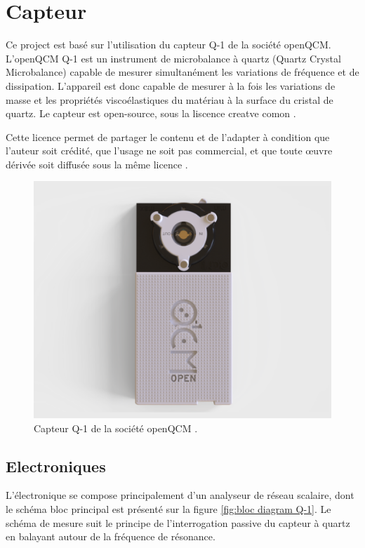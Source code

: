 \chapter{Capteur}

Ce project est basé sur l'utilisation du capteur Q-1 de la société openQCM.
L’openQCM Q-1 est un instrument de microbalance à quartz (Quartz Crystal Microbalance) capable de mesurer simultanément les variations de fréquence et de dissipation. 
L’appareil est donc capable de mesurer à la fois les variations de masse et les propriétés viscoélastiques du matériau à la surface du cristal de quartz.
Le capteur est open-source, sous la liscence creatve comon \cite{manual-openqcmQ1}.

Cette licence permet de partager le contenu et de l’adapter à condition que l’auteur soit crédité, que l’usage ne soit pas commercial, 
et que toute œuvre dérivée soit diffusée sous la même licence \cite{cc-by-nc-sa-4.0}.

\begin{figure}[H]
    \centering
    \includegraphics[width=\textwidth]{assets/figures/Quartz-Crystal-Microbalance-QCM-D-openQCM-Q-1.png}
    \caption{Capteur Q-1 de la société openQCM \cite{manual-openqcmQ1}.}
    \label{fig:Q-1}
\end{figure}

\section{Electroniques}
L’électronique se compose principalement d’un analyseur de réseau scalaire, dont le schéma bloc principal est présenté sur la figure \ref{fig:bloc diagram Q-1}. Le schéma de mesure suit le principe de l’interrogation passive du capteur à quartz en balayant autour de la fréquence de résonance.

